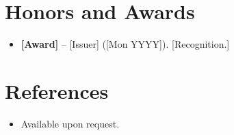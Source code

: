 \documentclass[11pt,a4paper,sans]{moderncv}
\begin{document}

\section{Honors and Awards}
\vspace{1pt}
\begin{itemize}
\item{\textbf{[Award]} -- [Issuer] ([Mon YYYY]). [Recognition.]}
\end{itemize}


\section{References}
\vspace{1pt}
\begin{itemize}
\item{Available upon request.}
\end{itemize}
\end{document}

